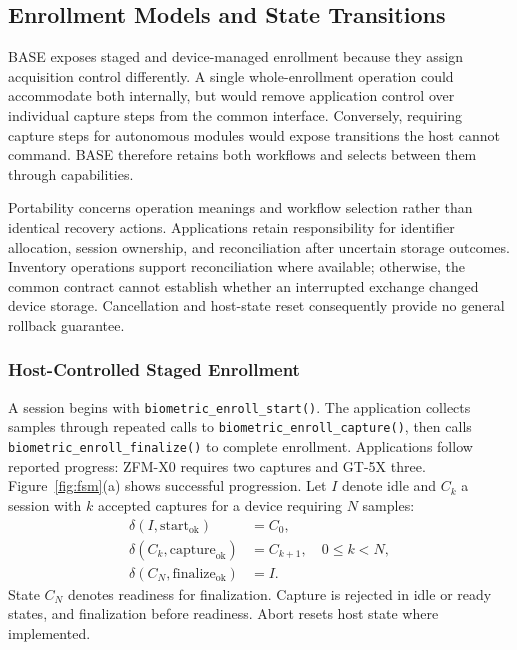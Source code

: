 \subsection{Enrollment Models and State Transitions}

BASE exposes staged and device-managed enrollment because they assign acquisition control differently. A single whole-enrollment operation could accommodate both internally, but would remove application control over individual capture steps from the common interface. Conversely, requiring capture steps for autonomous modules would expose transitions the host cannot command. BASE therefore retains both workflows and selects between them through capabilities.

Portability concerns operation meanings and workflow selection rather than identical recovery actions. Applications retain responsibility for identifier allocation, session ownership, and reconciliation after uncertain storage outcomes. Inventory operations support reconciliation where available; otherwise, the common contract cannot establish whether an interrupted exchange changed device storage. Cancellation and host-state reset consequently provide no general rollback guarantee.

\subsubsection{Host-Controlled Staged Enrollment}

A session begins with \texttt{biometric\_\allowbreak{}enroll\_\allowbreak{}start()}. The application collects samples through repeated calls to \texttt{biometric\_\allowbreak{}enroll\_\allowbreak{}capture()}, then calls \texttt{biometric\_\allowbreak{}enroll\_\allowbreak{}finalize()} to complete enrollment. Applications follow reported progress: ZFM-X0 requires two captures and GT-5X three. Figure~\ref{fig:fsm}(a) shows successful progression. Let $I$ denote idle and $C_k$ a session with $k$ accepted captures for a device requiring $N$ samples:
\begin{align}
\delta(I,\mathrm{start}_{\mathrm{ok}})&=C_0, \\
\delta(C_k,\mathrm{capture}_{\mathrm{ok}})&=C_{k+1},\quad 0\leq k<N, \\
\delta(C_N,\mathrm{finalize}_{\mathrm{ok}})&=I.
\end{align}
State $C_N$ denotes readiness for finalization. Capture is rejected in idle or ready states, and finalization before readiness. Abort resets host state where implemented.

